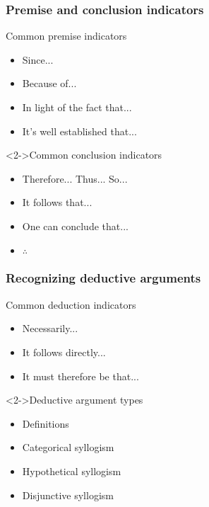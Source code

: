 \documentclass[10pt,letterpaper,xcolor=dvipsnames,handout]{beamer}
\begin{document}
\begin{frame}
\frametitle{Premise and conclusion indicators}

\begin{block}{Common premise indicators}
\begin{itemize}
  \item Since...
  \item Because of...
  \item In light of the fact that...
  \item It's well established that...
\end{itemize}
\end{block}

\begin{block}<2->{Common conclusion indicators}
\begin{itemize}
  \item Therefore... Thus... So...
  \item It follows that...
  \item One can conclude that...
  \item $\therefore$
\end{itemize}
\end{block}

\end{frame}

\begin{frame}
\frametitle{Recognizing deductive arguments}

\begin{block}{Common deduction indicators}
\begin{itemize}
  \item Necessarily...
  \item It follows directly...
  \item It must therefore be that...
\end{itemize}

\end{block}

\begin{block}<2->{Deductive argument types}
\begin{itemize}
  \item Definitions
  \item Categorical syllogism
  \item Hypothetical syllogism
  \item Disjunctive syllogism
\end{itemize}
\end{block}

\end{frame}
\end{document}
